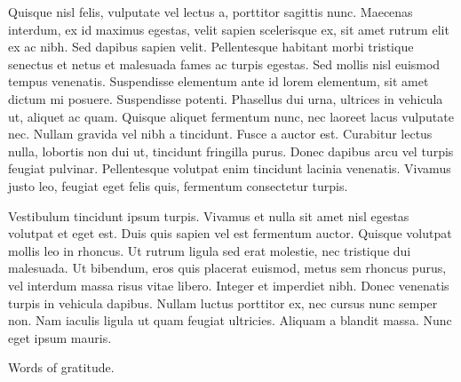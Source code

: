 \documentclass[
11pt, %
english, %
singlespacing, %
headsepline, %
onecolumn
]{MastersDoctoralThesis} %
\begin{document}
\begin{addmargin}[4.2em]{2.5em}
\begin{zusammenfassung}
Quisque nisl felis, vulputate vel lectus a, porttitor sagittis nunc. Maecenas interdum, ex id maximus egestas, velit sapien scelerisque ex, sit amet rutrum elit ex ac nibh. Sed dapibus sapien velit. Pellentesque habitant morbi tristique senectus et netus et malesuada fames ac turpis egestas. Sed mollis nisl euismod tempus venenatis. Suspendisse elementum ante id lorem elementum, sit amet dictum mi posuere. Suspendisse potenti. Phasellus dui urna, ultrices in vehicula ut, aliquet ac quam. Quisque aliquet fermentum nunc, nec laoreet lacus vulputate nec. Nullam gravida vel nibh a tincidunt. Fusce a auctor est. Curabitur lectus nulla, lobortis non dui ut, tincidunt fringilla purus. Donec dapibus arcu vel turpis feugiat pulvinar. Pellentesque volutpat enim tincidunt lacinia venenatis. Vivamus justo leo, feugiat eget felis quis, fermentum consectetur turpis.

Vestibulum tincidunt ipsum turpis. Vivamus et nulla sit amet nisl egestas volutpat et eget est. Duis quis sapien vel est fermentum auctor. Quisque volutpat mollis leo in rhoncus. Ut rutrum ligula sed erat molestie, nec tristique dui malesuada. Ut bibendum, eros quis placerat euismod, metus sem rhoncus purus, vel interdum massa risus vitae libero. Integer et imperdiet nibh. Donec venenatis turpis in vehicula dapibus. Nullam luctus porttitor ex, nec cursus nunc semper non. Nam iaculis ligula ut quam feugiat ultricies. Aliquam a blandit massa. Nunc eget ipsum mauris.

\end{zusammenfassung}
\end{addmargin}


\begin{acknowledgements}
\addchaptertocentry{\acknowledgementname} %


Words of gratitude.


\end{acknowledgements}


\tableofcontents %
\end{document}
